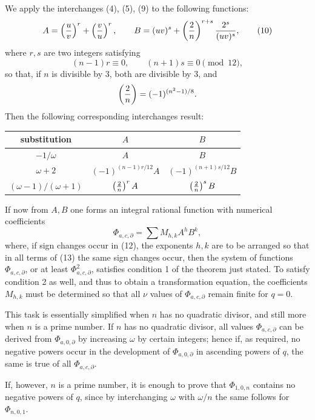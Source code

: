 \documentclass[11pt]{article}
\begin{document}
We apply the interchanges (4), (5), (9) to the following functions:
\begin{equation}
 A=\left({u\over v}\right)^r+\left({v\over u}\right)^r,
 \qquad
 B=(uv)^s+\left({2\over n}\right)^{r+s}{2^s\over(uv)^s},
\tag{10}
\end{equation}
where $r,s$ are two integers satisfying
\begin{equation}
 (n-1)r\equiv0,
 \qquad
 (n+1)s\equiv0\pmod{12},
\tag{11}
\end{equation}
so that, if $n$ is divisible by $3$, both are divisible by $3$, and
\[
 \left({2\over n}\right)=(-1)^{(n^2-1)/8}.
\]
Then the following corresponding interchanges result:
\begin{center}
\begin{tabular}{c|cc}
substitution & $A$ & $B$\\
\hline
$-1/\omega$ & $A$ & $B$\\[0.2em]
$\omega+2$ & $(-1)^{(n-1)r/12}A$ & $(-1)^{(n+1)s/12}B$\\[0.2em]
$(\omega-1)/(\omega+1)$ & $\left({2\over n}\right)^r A$ & $\left({2\over n}\right)^s B$
\end{tabular}
\par{}
\end{center}
If now from $A,B$ one forms an integral rational function with numerical coefficients
\begin{equation}
 \Phi_{a,c,\partial}=\sum M_{h,k}A^hB^k,
\tag{13}
\end{equation}
where, if sign changes occur in (12), the exponents $h,k$ are to be arranged so that in all terms of (13) the same sign changes occur, then the system of functions $\Phi_{a,c,\partial}$, or at least $\Phi_{a,c,\partial}^2$, satisfies condition 1 of the theorem just stated. To satisfy condition 2 as well, and thus to obtain a transformation equation, the coefficients $M_{h,k}$ must be determined so that all $\nu$ values of $\Phi_{a,c,\partial}$ remain finite for $q=0$.

This task is essentially simplified when $n$ has no quadratic divisor, and still more when $n$ is a prime number. If $n$ has no quadratic divisor, all values $\Phi_{a,c,\partial}$ can be derived from $\Phi_{a,0,\partial}$ by increasing $\omega$ by certain integers; hence if, as required, no negative powers occur in the development of $\Phi_{a,0,\partial}$ in ascending powers of $q$, the same is true of all $\Phi_{a,c,\partial}$.

If, however, $n$ is a prime number, it is enough to prove that $\Phi_{1,0,n}$ contains no negative powers of $q$, since by interchanging $\omega$ with $\omega/n$ the same follows for $\Phi_{n,0,1}$.
\end{document}
